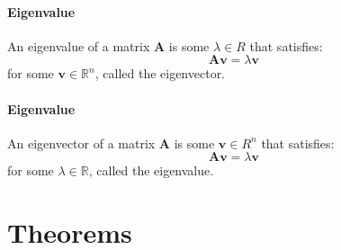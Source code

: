 \documentclass{scrartcl}
\newcommand{\R}{\mathbb{R}}
\renewcommand{\vec}[1]{\mathbf{#1}}
\begin{document}
\paragraph{Eigenvalue}
An eigenvalue of a matrix $ \vec{A} $ is some $ \lambda \in R $ that satisfies:
\begin{equation}
\vec{A} \vec{v} = \lambda \vec{v}
\end{equation}
for some $ \vec{v} \in \R^{n} $, called the eigenvector.

\paragraph{Eigenvalue}
An eigenvector of a matrix $ \vec{A} $ is some $ \vec{v} \in R^{n} $ that satisfies:
\begin{equation}
\vec{A} \vec{v} = \lambda \vec{v}
\end{equation}
for some $ \lambda \in \R $, called the eigenvalue.

\section{Theorems}
\end{document}
